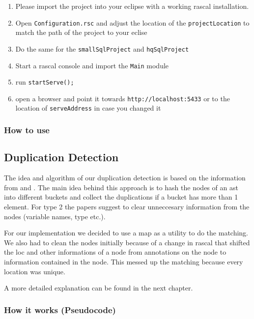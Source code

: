 \documentclass{uva-inf-article}
\begin{document}
\begin{enumerate}

\item
  Please import the project into your eclipse with a working rascal
  installation.
\item
  Open \texttt{Configuration.rsc} and adjust the location of the
  \texttt{projectLocation} to match the path of the project to your
  eclise
\item
  Do the same for the \texttt{smallSqlProject} and \texttt{hqSqlProject}
\item
  Start a rascal console and import the \texttt{Main} module
\item
  run \texttt{startServe();}
\item
  open a browser and point it towards \texttt{http://localhost:5433} or
  to the location of \texttt{serveAddress} in case you changed it
\end{enumerate}


\subsubsection{How to use}


\subsection{Duplication Detection}

The idea and algorithm of our duplication detection is based on the
information from \cite{lazar2014clone} and \cite{baxter1998clone}. The main idea behind this approach
is to hash the nodes of an ast into different buckets and collect the
duplications if a bucket has more than 1 element. For type 2 the papers
suggest to clear unneccesary information from the nodes (variable names,
type etc.).

For our implementation we decided to use a map as a utility to do the
matching. We also had to clean the nodes initially because of a change
in rascal that shifted the loc and other informations of a node from
annotations on the node to information contained in the node. This
messed up the matching because every location was unique.

A more detailed explanation can be found in the next chapter.


\subsubsection{How it works (Pseudocode)}
\end{document}
